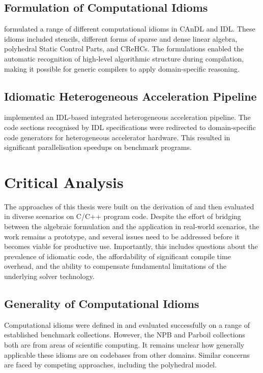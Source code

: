 \subsection*{Formulation of Computational Idioms}

     formulated a range of
    different computational idioms in CAnDL and IDL.
    These idioms included stencils, different forms of sparse and dense linear
    algebra, polyhedral Static Control Parts, and CReHCs.
    The formulations enabled the automatic recognition of high-level algorithmic
    structure during compilation, making it possible for generic compilers to
    apply domain-specific reasoning.

\subsection*{Idiomatic Heterogeneous Acceleration Pipeline}

     implemented an IDL-based integrated heterogeneous
    acceleration pipeline.
    The code sections recognised by IDL specifications were redirected to
    domain-specific code generators for heterogeneous accelerator hardware.
    This resulted in significant parallelisation speedups on benchmark
    programs.

\section{Critical Analysis}

    The approaches of this thesis were built on the derivation of
     and then evaluated in diverse scenarios on C/C++
    program code.
    Despite the effort of bridging between the algebraic formulation and the
    application in real-world scenarios, the work remains a prototype, and
    several issues need to be addressed before it becomes viable for productive
    use.
    Importantly, this includes questions about the prevalence of idiomatic code,
    the affordability of significant compile time overhead, and the ability to
    compensate fundamental limitations of the underlying solver technology.

\subsection*{Generality of Computational Idioms}  

    Computational idioms were defined in
     and
    evaluated successfully on a range of established benchmark collections.
    However, the NPB and Parboil collections both are from areas of scientific
    computing.
    It remains unclear how generally applicable these idioms are on codebases
    from other domains.
    Similar concerns are faced by competing approaches, including the
    polyhedral model.

